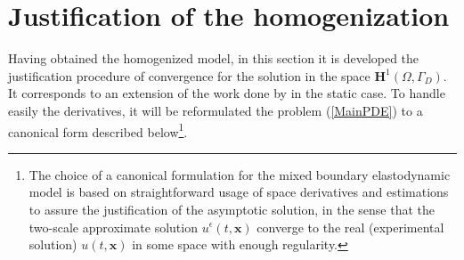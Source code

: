 \section{Justification of the homogenization}
Having obtained the homogenized model, in this section it is developed the justification procedure of convergence for the solution in the space $\mathbf{H}^1(\Omega, \Gamma_D)$. It corresponds to an extension of the work done by \cite{oleinik1992mathematical} in the static case. To handle easily the derivatives, it will be reformulated the problem (\ref{MainPDE}) to a canonical form described below\footnote{The choice of a canonical formulation for the mixed boundary elastodynamic model is based on straightforward usage of space derivatives and estimations to assure the justification of the asymptotic solution, in the sense that the two-scale approximate solution $u^{\epsilon}(t, \mathbf{x})$ converge to the real (experimental solution) $u(t, \mathbf{x})$ in some space with enough regularity.}.

